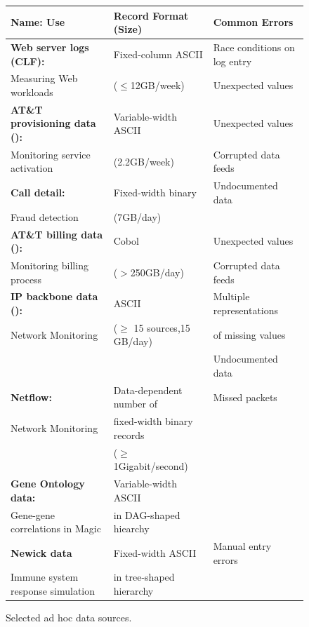 \begin{figure}
\begin{center}
\scriptsize
\begin{tabular}{@{}|l|l|l|}
\hline
\textbf{Name:} Use & Record Format (Size) 
           & Common Errors \\ \hline\hline
\textbf{Web server logs (CLF):}           & Fixed-column ASCII & Race conditions on log entry\\ 
Measuring Web workloads  & ($\leq$12GB/week)  & Unexpected values\\ \hline
\textbf{AT\&T provisioning data (\dibbler{}):} & Variable-width ASCII & Unexpected values \\ 
Monitoring service activation  & (2.2GB/week) & Corrupted data feeds \\ \hline
\textbf{Call detail:}                   & Fixed-width binary &  Undocumented data\\
Fraud detection                         &   (\appr{}7GB/day) & \\ \hline 
\textbf{AT\&T billing data (\ningaui{}):}      & Cobol      & Unexpected values\\ 
Monitoring billing process  &  ($>$250GB/day) & Corrupted data feeds \\ \hline
\textbf{IP backbone data (\darkstar{}):}  & ASCII & Multiple representations \\
{Network Monitoring}       &  ($\ge$ 15 sources,\appr{}15 GB/day)  & of missing values \\
          & & Undocumented data \\ \hline
\textbf{Netflow:}               & Data-dependent number of & Missed packets\\ 
{Network Monitoring}  & fixed-width binary records & \\ 
                      & ($\ge$1Gigabit/second) & \\ \hline
\textbf{Gene Ontology data:}    & Variable-width ASCII & \\
Gene-gene correlations in Magic & in DAG-shaped hiearchy & \\\hline
\textbf{Newick data}              & Fixed-width ASCII & Manual entry errors \\
Immune system response simulation & in tree-shaped hierarchy 
& \\
\hline
\end{tabular}
\normalsize
\caption{Selected ad hoc data sources.}
\label{figure:data-sources}
\end{center}
\end{figure}

